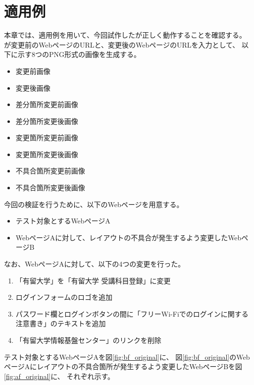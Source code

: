\chapter{適用例}\label{cha:Indication}
本章では、適用例を用いて、今回試作した\toolName が正しく動作することを確認する。
\toolName が変更前のWebページのURLと、変更後のWebページのURLを入力として、
以下に示す8つのPNG形式の画像を生成する。
\begin{itemize}
    \setlength{\itemsep}{0pt}
          \setlength{\parsep}{0pt}
    \item 変更前画像
    \item 変更後画像
    \item 差分箇所変更前画像
    \item 差分箇所変更後画像
    \item 変更箇所変更前画像
    \item 変更箇所変更後画像
    \item 不具合箇所変更前画像
    \item 不具合箇所変更後画像
\end{itemize}
今回の検証を行うために、以下のWebページを用意する。
\begin{itemize}
    \setlength{\itemsep}{0pt}
          \setlength{\parsep}{0pt}
    \item テスト対象とするWebページA\label{item: ex1_bf}
    \item WebページAに対して、レイアウトの不具合が発生するよう変更したWebページB\label{item: ex1_af}
\end{itemize}
なお、WebページAに対して、以下の4つの変更を行った。
\begin{enumerate}[label=変更\arabic*., leftmargin=1.8cm]
    \item 「有留大学」を「有留大学 受講科目登録」に変更\label{item: Act1}
    \item ログインフォームのロゴを追加\label{item: Act2}
    \item パスワード欄とログインボタンの間に「フリーWi-Fiでのログインに関する注意書き」のテキストを追加\label{item: Act3}
    \item 「有留大学情報基盤センター」のリンクを削除\label{item: Act4}
\end{enumerate}
テスト対象とするWebページAを図\ref{fig:bf_original}に、
図\ref{fig:bf_original}のWebページAにレイアウトの不具合箇所が発生するよう変更したWebページBを図\ref{fig:af_original}に、
それぞれ示す。
